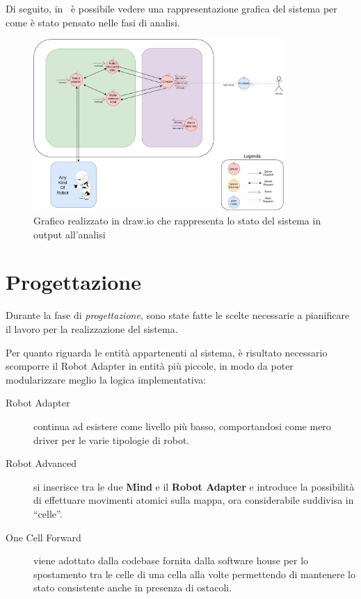 \documentclass{llncs}
\newcommand{\labelsec}[1]{\label{sec:#1}}
\begin{document}
Di seguito, in~ è possibile vedere una rappresentazione grafica del sistema per come è stato pensato nelle fasi di analisi.

\begin{figure}[h]
  \centering%
  \includegraphics[width=0.85\textwidth]{res/analysis}%
  \caption{Grafico realizzato in draw.io che rappresenta lo stato del sistema in output all'analisi}%
  \label{fig:analysis}
\end{figure}

\newpage

\section{Progettazione}\labelsec{project}

Durante la fase di \textit{progettazione}, sono state fatte le scelte necessarie a pianificare il lavoro per la realizzazione del sistema.

Per quanto riguarda le entità appartenenti al sistema, è risultato necessario scomporre il Robot Adapter in entità più piccole, in modo da poter modularizzare meglio la logica implementativa:

\begin{description}
  \item[Robot Adapter] continua ad esistere come livello più basso, comportandosi come mero driver per le varie tipologie di robot.
  \item[Robot Advanced] si inserisce tra le due \textbf{Mind} e il \textbf{Robot Adapter} e introduce la possibilità di effettuare movimenti atomici sulla mappa, ora considerabile suddivisa in ``celle''.
  \item[One Cell Forward] viene adottato dalla codebase fornita dalla software house per lo spostamento tra le celle di una cella alla volte permettendo di mantenere lo stato consistente anche in presenza di ostacoli.
\end{description}
\end{document}
